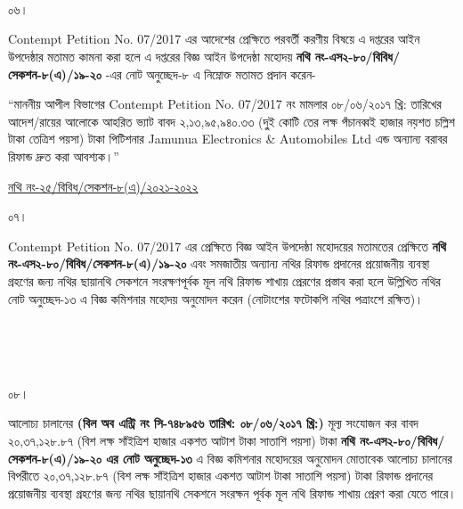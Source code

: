 \documentclass[12pt]{article}
\newcommand{\fileno}{নথি নং-২৫/বিবিধ/সেকশন-৮(এ)/২০২১-২০২২}
\newcommand{\tvat}{২,১৩,৯৫,৯৪০.৩৩ (দু্ই কোটি তের লক্ষ পঁচানব্বই হাজার নয়শত চল্লিশ টাকা তেত্রিশ পয়সা) টাকা}
\newcommand{\vat}{২০,৩৭,১২৮.৮৭ (বিশ লক্ষ সাঁইত্রিশ হাজার একশত আটাশ টাকা সাতাশি পয়সা) টাকা}
\newcommand{\cno}{৭৪৮৯৫৬}
\newcommand{\dt}{০৮/০৬/২০১৭}
\begin{document}
\\
\\
\\
\begin{minipage}[t]{0.05\linewidth}
০৬।
\end{minipage}
\begin{minipage}[t]{1\linewidth}
Contempt Petition No. 07/2017
এর আদেশের প্রেক্ষিতে পরবর্তী
করণীয় বিষয়ে এ দপ্তরের আইন
উপদেষ্ঠার মতামত কামনা করা হলে এ দপ্তরের
বিজ্ঞ আইন উপদেষ্ঠা মহোদয়
\textbf{নথি নং-এস২-৮০/বিবিধ/সেকশন-৮(এ)/১৯-২০}
-এর নোট অনুচ্ছেদ-৮ এ নিম্নোক্ত মতামত প্রদান করেন-


\hspace{1em}``মাননীয় আপীল বিভাগের
Contempt Petition No. 07/2017
নং মামলার ০৮/০৬/২০১৭ খ্রি: তারিখের
আদেশ/রায়ের আলোকে আহরিত ভ্যাট বাবদ
{\tvat} পিটিশনার
Jamunua Electronics \& Automobiles Ltd
এন্ড অন্যান্য বরাবর রিফান্ড
দ্রুত করা আবশ্যক।''
\end{minipage}
\newpage
\begin{minipage}[t]{0.59\linewidth}
\hspace{0.5em}
\end{minipage}
\begin{minipage}[t]{1\textwidth}
\underline{{\fileno}}
\end{minipage}
\begin{minipage}[t]{0.05\linewidth}
০৭।
\end{minipage}
\begin{minipage}[t]{1\linewidth}
Contempt Petition No. 07/2017
এর প্রেক্ষিতে বিজ্ঞ আইন উপদেষ্ঠা মহোদয়ের
মতামতের প্রেক্ষিতে
\textbf{নথি নং-এস২-৮০/বিবিধ/সেকশন-৮(এ)/১৯-২০}
এবং সমজাতীয় অন্যান্য নথির
রিফান্ড প্রদানের প্রয়োজনীয় ব্যবস্থা গ্রহণের
জন্য নথির ছায়ানথি সেকশনে
সংরক্ষণপূর্বক মূল নথি রিফান্ড
শাখায় প্রেরণের প্রস্তাব করা হলে উল্লিখিত নথির
নোট অনুচ্ছেদ-১৩ এ বিজ্ঞ কমিশনার মহোদয় অনুমোদন
করেন (নোটাংশের ফটোকপি নথির পত্রাংশে রক্ষিত)।
\end{minipage}
\\
\\
\\
\begin{minipage}[t]{0.05\linewidth}
০৮।
\end{minipage}
\begin{minipage}[t]{1\linewidth}
আলোচ্য চালানের
\textbf{(বিল অব এন্ট্রি নং সি-{\cno} তারিখ: {\dt} খ্রি:)} মূল্য সংযোজন কর বাবদ
{\vat} \textbf{নথি নং-এস২-৮০/বিবিধ/সেকশন-৮(এ)/১৯-২০
এর নোট অনুচ্ছেদ-১৩} এ বিজ্ঞ কমিশনার মহোদয়ের
অনুমোদন মোতাবেক আলোচ্য চালানের
বিপরীতে
{\vat} রিফান্ড প্রদানের প্রয়োজনীয় ব্যবস্থা গ্রহণের জন্য
নথির ছায়ানথি সেকশনে সংরক্ষন পূর্বক
মূল নথি রিফান্ড শাখায় প্রেরণ করা যেতে পারে।
\end{minipage}



\thispagestyle{laststyle}
\end{document}
